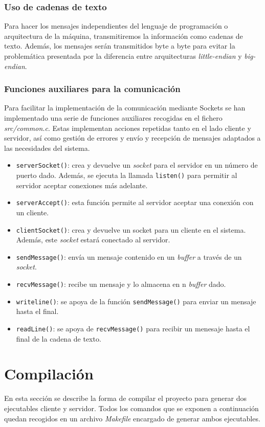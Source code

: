 \documentclass[]{article}
\begin{document}
\subsubsection{Uso de cadenas de texto}
\label{subsec:cadenas-texto}
Para hacer los mensajes independientes del lenguaje de programación o arquitectura de la máquina, transmitiremos la información como cadenas de texto. Además, los mensajes serán transmitidos byte a byte para evitar la problemática presentada por la diferencia entre  arquitecturas \textit{little-endian} y \textit{big-endian}.

\subsubsection{Funciones auxiliares para la comunicación}
\label{subsec:funciones}
Para facilitar la implementación de la comunicación mediante Sockets se han implementado una serie de funciones auxiliares recogidas en el fichero \textit{src/common.c}. Estas implementan acciones repetidas tanto en el lado cliente y servidor, así como gestión de errores y envío y recepción de mensajes adaptados a las necesidades del sistema. 

\begin{itemize}
    \item \texttt{serverSocket()}: crea y devuelve un \textit{socket} para el servidor en un número de puerto dado. Además, se ejecuta la llamada \texttt{listen()} para permitir al servidor aceptar conexiones más adelante. 
    \item \texttt{serverAccept()}: esta función permite al servidor aceptar una conexión con un cliente. 
    \item \texttt{clientSocket()}: crea y devuelve un socket para un cliente en el sistema. Además, este \textit{socket} estará conectado al servidor. 
    \item \texttt{sendMessage()}: envía un mensaje contenido en un \textit{buffer} a través de un \textit{socket}. 
    \item \texttt{recvMessage()}: recibe un mensaje y lo almacena en n \textit{buffer} dado. 
    \item \texttt{writeline()}: se apoya de la función \texttt{sendMessage()} para enviar un mensaje hasta el final. 
    \item \texttt{readLine()}: se apoya de \texttt{recvMessage()} para recibir un menesaje hasta el final de la cadena de texto. 
\end{itemize}

\section{Compilación}
\label{sec:compilacion}
En esta sección se describe la forma de compilar el proyecto para generar dos ejecutables cliente y servidor. Todos los comandos que se exponen a continuación quedan recogidos en un archivo \textit{Makefile} encargado de generar ambos ejecutables. 
\end{document}
